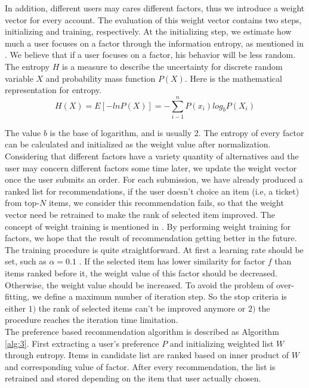 \documentclass{llncs}
\begin{document}
In addition, different users may cares different factors, thus we introduce a weight vector for every account. The evaluation of this weight vector contains two steps, initializing and training, respectively. At the initializing step, we estimate how much a user focuses on a factor through the information entropy, as mentioned in \cite{yang:pers}. We believe that if a user focuses on a factor, his behavior will be less random. The entropy $H$ is a measure to describe the uncertainty for discrete random variable $X$ and probability mass function $P(X)$. Here is the mathematical representation for entropy.\\
\begin{equation}
H(X)=E[-lnP(X)]= - \sum_{i-1}^n P(x_i)log_bP(X_i)
\end{equation}\par
The value $b$ is the base of logarithm, and is usually 2. The entropy of every factor can be calculated and initialized as the weight value after normalization. Considering that different factors have a variety quantity of alternatives and the user may concern different factors some time later, we update the weight vector once the user submits an order. For each submission, we have already produced a ranked list for recommendations, if the user doesn't choice an item (i.e, a ticket) from top-$N$ items, we consider this recommendation fails, so that the weight vector need be retrained to make the rank of selected item improved. The concept of weight training is mentioned in \cite{lor:flight}. By performing weight training for factors, we hope that the result of recommendation getting better in the future. The training procedure is quite straightforward. At first a learning rate should be set, such as $\alpha = 0.1$ . If the selected item has lower similarity for factor $f$ than items ranked before it, the weight value of this factor should be decreased. Otherwise, the weight value should be increased. To avoid the problem of over-fitting, we define a maximum number of iteration step. So the stop criteria is either $1)$ the rank of selected items can't be improved anymore or $2)$ the procedure reaches the iteration time limitation.\\
The preference based recommendation algorithm is described as Algorithm \ref{alg:3}. First extracting a user's preference  $P$ and initializing weighted list $W$ through entropy. Items in candidate list are ranked based on inner product of $W$ and corresponding value of factor. After every recommendation, the list is retrained and stored depending on the item that user actually chosen.
\end{document}
